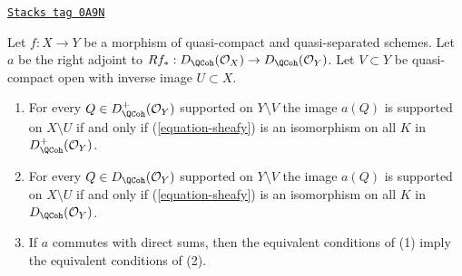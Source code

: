 \begin{lemma}
\label{duality-lemma-when-sheafy}
\href{https://stacks.math.columbia.edu/tag/0A9N}{\texttt{Stacks tag 0A9N}}

Let $f : X \to Y$ be a morphism of quasi-compact and quasi-separated
schemes. Let $a$ be the right adjoint to
$Rf_* : D_\QCoh(\mathcal{O}_X) \to D_\QCoh(\mathcal{O}_Y)$.
Let $V \subset Y$ be quasi-compact open with inverse image $U \subset X$.
\begin{enumerate}
\item For every $Q \in D_\QCoh^+(\mathcal{O}_Y)$
supported on $Y \setminus V$ the image $a(Q)$ is supported on
$X \setminus U$ if and only if (\ref{equation-sheafy})
is an isomorphism on all $K$ in $D_\QCoh^+(\mathcal{O}_Y)$.
\item For every $Q \in D_\QCoh(\mathcal{O}_Y)$
supported on $Y \setminus V$ the image $a(Q)$ is supported on
$X \setminus U$ if and only if (\ref{equation-sheafy})
is an isomorphism on all $K$ in $D_\QCoh(\mathcal{O}_Y)$.
\item If $a$ commutes with direct sums, then the equivalent conditions of
(1) imply the equivalent conditions of (2).
\end{enumerate}
\end{lemma}

